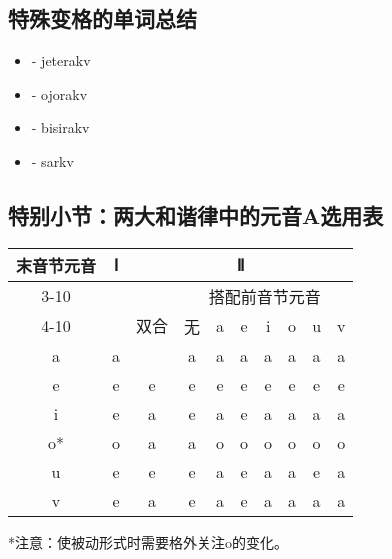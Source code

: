 \subsection{特殊变格的单词总结}

\begin{itemize}
    \item {} - jeterakv
    \item {} - ojorakv
    \item {} - bisirakv
    \item {} - sarkv
\end{itemize}

\subsection{特别小节：两大和谐律中的元音A选用表}

\begin{center}
    \begin{tabular}{c|c|c|c|c|c|c|c|c|c}
        \toprule
        \multirow{4}{*}{末音节元音} & \multirow{4}{*}{Ⅰ} & \multicolumn{8}{c}{Ⅱ} \\
        \cline{3-10} 
        & & \multirow{3}{*}{双合} & \multicolumn{7}{c}{搭配前音节元音} \\ 
        \cline{4-10} 
        & & & 无 & a & e & i & o & u & v \\\midrule
        a & \cellcolor{cyan} a & \cellcolor{cyan} a & \cellcolor{cyan} a & \cellcolor{cyan} a & \cellcolor{cyan} a & \cellcolor{cyan} a & \cellcolor{cyan} a & \cellcolor{cyan} a & \cellcolor{cyan} a \\\hline
        e & \cellcolor{lime} e & \cellcolor{lime} e & \cellcolor{lime} e & \cellcolor{lime} e & \cellcolor{lime} e & \cellcolor{lime} e & \cellcolor{lime} e & \cellcolor{lime} e & \cellcolor{lime} e \\\hline
        i & \cellcolor{lime} e & \cellcolor{cyan} a & \cellcolor{lime} e & \cellcolor{cyan} a & \cellcolor{lime} e & \cellcolor{cyan} a & \cellcolor{cyan} a & \cellcolor{cyan} a & \cellcolor{cyan} a \\\hline
        o* & \cellcolor{pink} o & \cellcolor{cyan} a & \cellcolor{cyan} a & \cellcolor{pink} o & \cellcolor{pink} o & \cellcolor{pink} o & \cellcolor{pink} o & \cellcolor{pink} o & \cellcolor{pink} o \\\hline
        u & \cellcolor{lime} e & \cellcolor{lime} e & \cellcolor{lime} e & \cellcolor{cyan} a & \cellcolor{lime} e & \cellcolor{cyan} a & \cellcolor{cyan} a & \cellcolor{lime} e & \cellcolor{cyan} a \\\hline
        v & \cellcolor{lime} e & \cellcolor{cyan} a & \cellcolor{lime} e & \cellcolor{cyan} a & \cellcolor{lime} e & \cellcolor{cyan} a & \cellcolor{cyan} a & \cellcolor{cyan} a & \cellcolor{cyan} a \\\bottomrule
    \end{tabular}
    
    *注意：使被动形式时需要格外关注o的变化。
\end{center}

